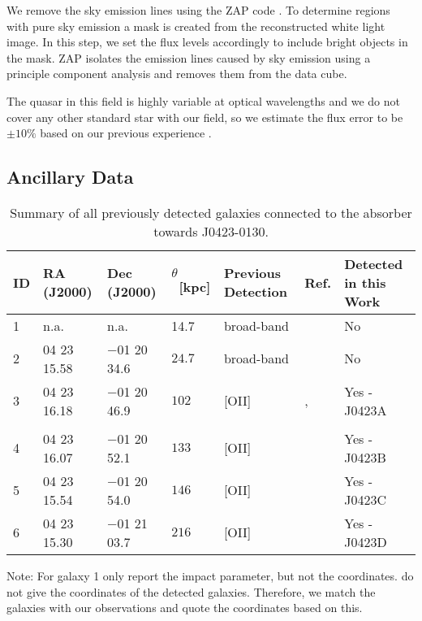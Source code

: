 \documentclass[a4paper,fleqn,usenatbib]{mnras}
\newcommand{\GalA}{J0423A}
\newcommand{\GalB}{J0423B}
\newcommand{\GalC}{J0423C}
\newcommand{\GalD}{J0423D}
\begin{document}
We remove the sky emission lines using the {\sc ZAP} code \mbox{\citep{Soto2016Zap}}. To determine regions with pure sky emission a mask is created from the reconstructed white light image. In this step, we set the flux levels accordingly to include bright objects in the mask. {\sc ZAP} isolates the emission lines caused by sky emission using a principle component analysis and removes them from the data cube. 

The quasar in this field is highly variable at optical wavelengths and we do not cover any other standard star with our field, so we estimate the flux error to be $\pm10\%$ based on our previous experience \citep{Rahmani2017observational, Peroux2017nature}.


\subsection{Ancillary Data}

\begin{table*}
\caption{Summary of all previously detected galaxies connected to the absorber towards J0423-0130.}
\label{TabCoordPrevStud}
\begin{tabular}{l l l l l l l}
\hline
ID & RA (J2000) & Dec (J2000) & $\theta$~[kpc] & Previous Detection & Ref. & Detected in this Work\\
\hline 
1 & n.a. & n.a. & 14.7 & broad-band & \citet{Churchill1996spatial} & No\\
2 & 04 23 15.58 & $-$01 20 34.6 & $24.7$ & broad-band & \citet{Rao2011groundbased} & No\\
3 & 04 23 16.18 & $-$01 20 46.9 & $102$ & [OII] & \citet{Yanny1992emission}, & Yes - \GalA\\ 
& & & & &\citet{Rao2011groundbased}\\
4 & 04 23 16.07 & $-$01 20 52.1 & $133$ & [OII] & \citet{Yanny1992emission} & Yes - \GalB\\
5 & 04 23 15.54 & $-$01 20 54.0 & $146$ & [OII] & \citet{Yanny1992emission} & Yes - \GalC\\
6 & 04 23 15.30 & $-$01 21 03.7 & $216$ & [OII] & \citet{Yanny1992emission} & Yes - \GalD\\
\hline
\end{tabular}
\begin{minipage}{\linewidth}
Note: For galaxy 1 \mbox{\citet{Churchill1996spatial}} only report the impact parameter, but not the coordinates. \mbox{\citet{Yanny1992emission}} do not give the coordinates of the detected galaxies. Therefore, we match the galaxies with our observations and quote the coordinates based on this.
\end{minipage}
\end{table*}
\end{document}
